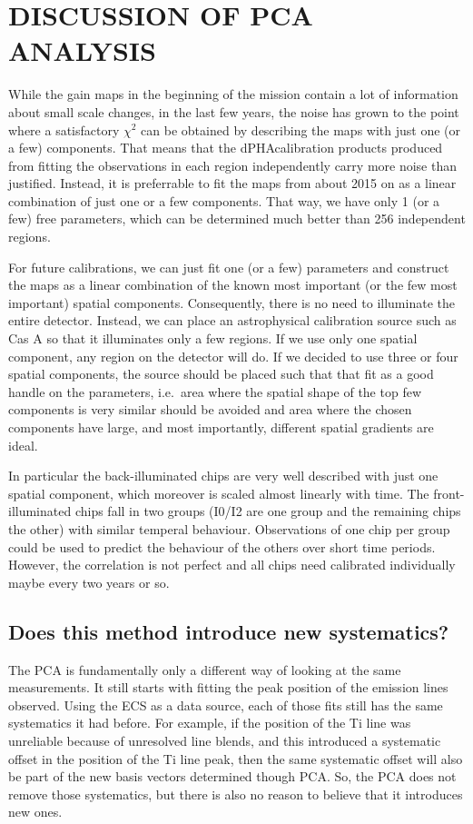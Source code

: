 \documentclass[]{spie}  %
\begin{document}
\section{DISCUSSION OF PCA ANALYSIS}
While the gain maps in the beginning of the mission contain a lot of information about small scale changes, in the last few years, the noise has grown to the point where a satisfactory $\chi^2$ can be obtained by describing the  maps with just one (or a few) components. That means that the dPHAcalibration products produced from fitting the observations in each region independently carry more noise than justified. Instead, it is preferrable to fit the maps from about 2015 on as a linear combination of just one or a few components. That way, we have only 1 (or a few) free parameters, which can be determined much better than 256 independent regions.

For future calibrations, we can just fit one (or a few) parameters and construct the maps as a linear combination of the known most important (or the few most important) spatial components. Consequently, there is no need to illuminate the entire detector. Instead, we can place an astrophysical calibration source such as Cas A so that it illuminates only a few regions. If we use only one spatial component, any region on the detector will do. If we decided to use three or four spatial components, the source should be placed such that that fit as a good handle on the parameters, i.e.\ area where the spatial shape of the top few components is very similar should be avoided and area where the chosen components have large, and most importantly, different spatial gradients are ideal.

In particular the back-illuminated chips are very well described with just one spatial component, which moreover is scaled almost linearly with time. The front-illuminated chips fall in two groups (I0/I2 are one group and the remaining chips the other) with similar temperal behaviour. Observations of one chip per group could be used to predict the behaviour of the others over short time periods. However, the correlation is not perfect and all chips need calibrated individually maybe every two years or so.

\subsection{Does this method introduce new systematics?}
The PCA is fundamentally only a different way of looking at the same measurements. It still starts with fitting the peak position of the emission lines observed. Using the ECS as a data source, each of those fits still has the same systematics it had before. For example, if the position of the Ti line was unreliable because of unresolved line blends, and this introduced a systematic offset in the position of the Ti line peak, then the same systematic offset will also be part of the new basis vectors determined though PCA. So, the PCA does not remove those systematics, but there is also no reason to believe that it introduces new ones.
\end{document}
